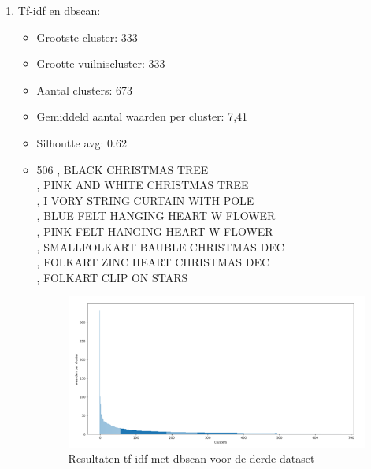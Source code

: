\begin{enumerate}
    \item Tf-idf en dbscan:
    \begin{itemize}
        \item Grootste cluster: 333
        \item Grootte vuilniscluster: 333
        \item Aantal clusters: 673
        \item Gemiddeld aantal waarden per cluster: 7,41
        \item Silhoutte avg: 0.62
        \item
        506 , BLACK CHRISTMAS TREE
        \\ , PINK AND WHITE CHRISTMAS TREE
        \\ , I VORY STRING CURTAIN WITH POLE
        \\ , BLUE FELT HANGING HEART W FLOWER
        \\ , PINK FELT HANGING HEART W FLOWER
        \\ , SMALLFOLKART BAUBLE CHRISTMAS DEC
        \\ , FOLKART ZINC HEART CHRISTMAS DEC
        \\ , FOLKART CLIP ON STARS
        \begin{figure}[h]
            \centering
            \includegraphics[width=0.7\linewidth]{../foto's/retailtfidfdbscan}
            \caption{Resultaten tf-idf met dbscan voor de derde dataset}
            \label{fig:dataset3_tf-idf_dbscan}
        \end{figure}
    \end{itemize}
    \newpage


\end{enumerate}
